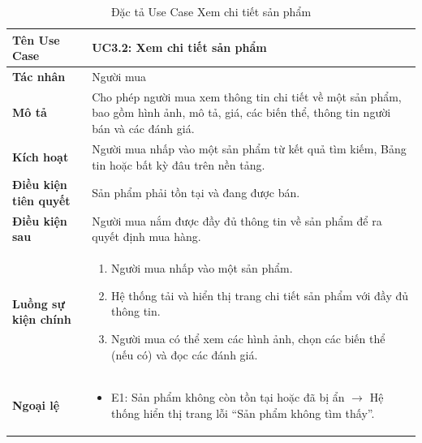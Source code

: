 \begin{table}[H]
\centering
\begin{tabularx}{\textwidth}{|l|X|}
\hline
\textbf{Tên Use Case} & \textbf{UC3.2: Xem chi tiết sản phẩm} \\ \hline
\textbf{Tác nhân} & Người mua \\ \hline
\textbf{Mô tả} & Cho phép người mua xem thông tin chi tiết về một sản phẩm, bao gồm hình ảnh, mô tả, giá, các biến thể, thông tin người bán và các đánh giá. \\ \hline
\textbf{Kích hoạt} & Người mua nhấp vào một sản phẩm từ kết quả tìm kiếm, Bảng tin hoặc bất kỳ đâu trên nền tảng. \\ \hline
\textbf{Điều kiện tiên quyết} & Sản phẩm phải tồn tại và đang được bán. \\ \hline
\textbf{Điều kiện sau} & Người mua nắm được đầy đủ thông tin về sản phẩm để ra quyết định mua hàng. \\ \hline
\textbf{Luồng sự kiện chính} & 
\begin{enumerate}
    \item Người mua nhấp vào một sản phẩm.
    \item Hệ thống tải và hiển thị trang chi tiết sản phẩm với đầy đủ thông tin.
    \item Người mua có thể xem các hình ảnh, chọn các biến thể (nếu có) và đọc các đánh giá.
\end{enumerate} \\ \hline
\textbf{Ngoại lệ} & 
\begin{itemize}
    \item E1: Sản phẩm không còn tồn tại hoặc đã bị ẩn $\rightarrow$ Hệ thống hiển thị trang lỗi ``Sản phẩm không tìm thấy''.
\end{itemize} \\ \hline
\end{tabularx}
\caption{Đặc tả Use Case Xem chi tiết sản phẩm}
\end{table}


